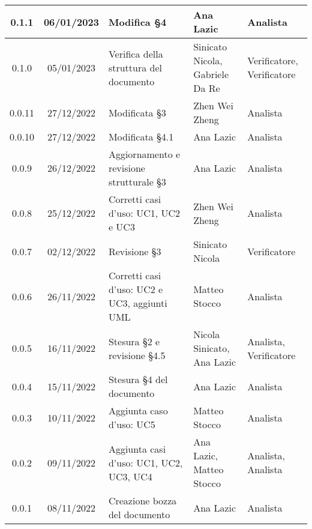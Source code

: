 \begin{center}
\begin{tabularx}{\textwidth}{| c | c | X | X | X |}
	\hline
	0.1.1 & 06/01/2023 & Modifica §4 & Ana Lazic & Analista \\
	\hline
	0.1.0 & 05/01/2023 & Verifica della struttura del documento & Sinicato Nicola, Gabriele Da Re & Verificatore, Verificatore\\
	\hline
	0.0.11 & 27/12/2022 & Modificata §3 & Zhen Wei Zheng & Analista\\
    	\hline
	0.0.10 & 27/12/2022 & Modificata §4.1 & Ana Lazic & Analista\\
   	\hline
	0.0.9 & 26/12/2022 & Aggiornamento e revisione strutturale §3 & Ana Lazic & Analista\\
	\hline
	0.0.8 & 25/12/2022 & Corretti casi d'uso: UC1, UC2 e UC3 & Zhen Wei Zheng & Analista\\
	\hline
	0.0.7 & 02/12/2022 & Revisione §3 & Sinicato Nicola & Verificatore\\
	\hline
	0.0.6 & 26/11/2022 & Corretti casi d'uso: UC2 e UC3, aggiunti UML & Matteo Stocco & Analista\\
	\hline
	0.0.5 & 16/11/2022	 & Stesura §2 e revisione §4.5 & Nicola Sinicato, Ana Lazic & Analista, Verificatore\\
	\hline
	0.0.4 & 15/11/2022	 & Stesura §4 del documento & Ana Lazic & Analista\\
	\hline
	0.0.3 & 10/11/2022 & Aggiunta caso d’uso: UC5 & Matteo Stocco & Analista\\
	\hline
	0.0.2 & 09/11/2022	 & Aggiunta casi d’uso: UC1, UC2, UC3, UC4 & Ana Lazic, Matteo Stocco & Analista, Analista\\
	\hline
	0.0.1 & 08/11/2022 & Creazione bozza del documento & Ana Lazic & Analista\\
	\hline
\end{tabularx}		
\end{center}
